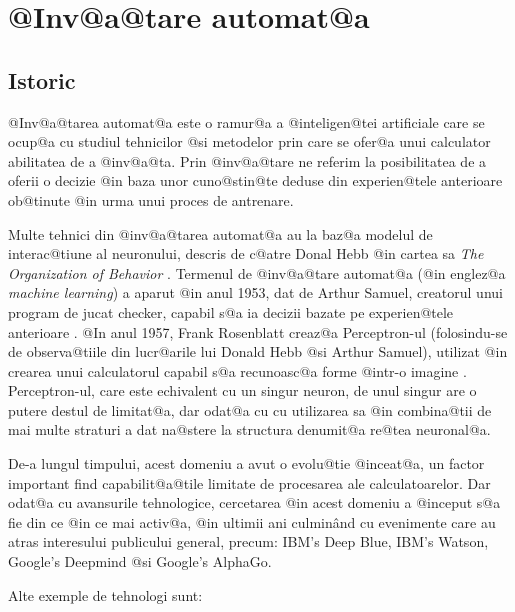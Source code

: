 \newpage

\chapter{ @Inv@a@tare automat@a }

\section{Istoric}

	@Inv@a@tarea automat@a este o ramur@a a @inteligen@tei artificiale care se ocup@a cu studiul tehnicilor @si metodelor prin care se ofer@a unui calculator abilitatea de a @inv@a@ta. Prin @inv@a@tare ne referim la posibilitatea de a oferii o decizie @in baza unor cuno@stin@te deduse din experien@tele anterioare ob@tinute @in urma unui proces de antrenare.

 Multe tehnici din @inv@a@tarea automat@a au la baz@a modelul de interac@tiune al neuronului, descris de c@atre Donal Hebb @in cartea sa {\sl The Organization of Behavior} \cite{donald-hebb-book}. Termenul de @inv@a@tare automat@a (@in englez@a {\sl machine learning}) a aparut @in anul 1953, dat de Arthur Samuel, creatorul unui program de jucat checker, capabil s@a ia decizii bazate pe experien@tele anterioare \cite{arthur-samuel}. @In anul 1957, Frank Rosenblatt creaz@a Perceptron-ul (folosindu-se de observa@tiile din lucr@arile lui Donald Hebb @si Arthur Samuel), utilizat @in crearea unui calculatorul capabil s@a recunoasc@a forme @intr-o imagine . Perceptron-ul, care este echivalent cu un singur neuron, de unul singur are o putere destul de limitat@a, dar odat@a cu cu  utilizarea sa @in combina@tii de mai multe straturi a dat na@stere la structura denumit@a re@tea neuronal@a. 
 
 De-a lungul timpului, acest domeniu a avut o evolu@tie @inceat@a, un factor important find capabilit@a@tile limitate de procesarea ale calculatoarelor. Dar odat@a cu avansurile tehnologice, cercetarea @in acest domeniu a @inceput s@a fie din ce @in ce mai activ@a, @in ultimii ani culmin\^ and cu evenimente care au atras interesului publicului general, precum: IBM's Deep Blue, IBM's Watson, Google's Deepmind @si Google's AlphaGo.

Alte exemple de tehnologi sunt:

